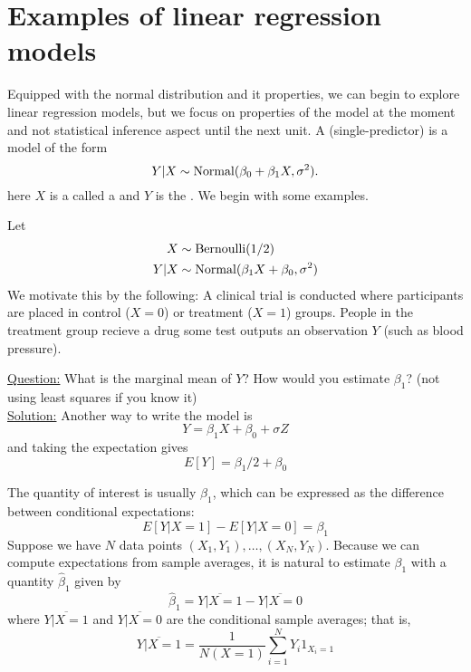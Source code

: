  \section{Examples of linear regression models}
Equipped with the normal distribution and it properties, we can begin to explore linear regression models, but we focus on properties of the model at the moment and not statistical inference aspect until the next unit. A (single-predictor)  is a model of the form 
\begin{equation}
Y|X \sim {\rm Normal}(\beta_0 + \beta_1 X,\sigma^2). 
\end{equation}
here $X$ is a called a  and $Y$ is the . We begin with some examples. 

 

 \begin{example}\label{ex:zerothreg}
 Let
\begin{align*}
X &\sim {\rm Bernoulli}(1/2)\\
Y|X &\sim {\rm Normal}(\beta_1X + \beta_0,\sigma^2)
\end{align*}
 We motivate this by the following: A clinical trial is conducted where participants are placed in control ($X=0$) or treatment ($X=1$) groups. People in the treatment group recieve a drug some test outputs an observation $Y$ (such as blood pressure).

 \noindent
\underline{Question:} What is the marginal mean of $Y$? How would you estimate $\beta_1$? (not using least squares if you know it)  \\


 \noindent
\underline{Solution:} 
Another way to write the model is 
\begin{equation}
Y = \beta_1X + \beta_0 + \sigma Z
\end{equation}
and taking the expectation gives
\begin{equation}
E[Y] = \beta_1/2 + \beta_0
\end{equation}

The quantity of interest is usually $\beta_1$, which can be expressed as the difference between conditional expectations:
\begin{equation}
E[Y|X=1] - E[Y|X=0] = \beta_1
\end{equation}
Suppose we have $N$ data points $(X_1,Y_1),\dots,(X_N,Y_N)$.
Because we can compute expectations from sample averages, it is natural to estimate $\beta_1$ with a quantity $\hat{\beta}_1$ given by
\begin{equation}
\widehat{\beta}_1 =\overline{Y|X=1} - \overline{Y|X=0}
\end{equation}
where $\overline{Y|X=1}$ and $\overline{Y|X=0}$ are the conditional sample averages; that is,
\begin{equation}
 \overline{Y|X=1} = \frac{1}{N(X=1)}\sum_{i=1}^N Y_i1_{X_i=1}
 \end{equation}



\end{example}
